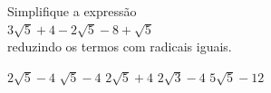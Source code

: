 Simplifique a expressão\\$3\sqrt{5}+4-2\sqrt{5}-8+\sqrt{5}$\\reduzindo os termos com radicais iguais.

$2\sqrt{5}-4$
$\sqrt{5}-4$
$2\sqrt{5}+4$
$2\sqrt{3}-4$
$5\sqrt{5}-12$


